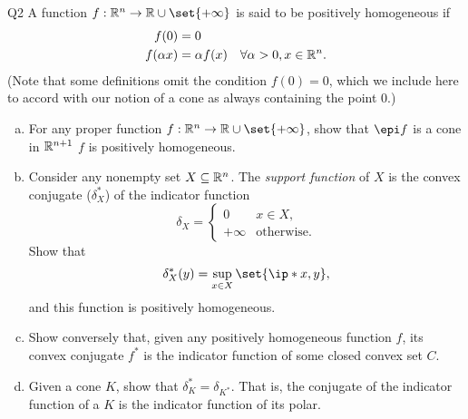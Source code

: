 \documentclass{article}
\begin{document}
\begin{problem}
    {Q2}
    A function $f:\R^n\rightarrow\R\cup\set{+\infty}$ is said to be positively homogeneous if
    \begin{align*}
        f(0) &= 0 \\
        f(\alpha x) &= \alpha f(x) \quad \forall \alpha > 0, x\in\mathbb{R}^n.
    \end{align*}
    (Note that some definitions omit the condition $f(0) = 0$, which we include here to accord with our notion of a cone as always containing the point $0$.)
    \begin{enumerate}[(a)]
        \item For any proper function $f:\R^n\rightarrow\R\cup\set{+\infty}$, show that $\epi f$ is a cone in $\mathbb{R}^{n+1}$ \iff $f$ is positively homogeneous.
        \item Consider any nonempty set $X\subseteq\mathbb{R}^n$. The \textit{support function} of $X$ is the convex conjugate ($\delta_X^*$) of the indicator function \[\delta_X = \begin{cases}
            0 & x\in X,\\
            +\infty & \text{otherwise}.
        \end{cases}\]
        Show that \[\delta_X^*(y)=\sup_{x\in X}\set{\ip*{x, y}},\] and this function is positively homogeneous.
        \item Show conversely that, given any positively homogeneous function $f$, its convex conjugate $f^*$ is the indicator function of some closed convex set $C$.
        \item Given a cone $K$, show that $\delta_K^* = \delta_{K^*}$. That is, the conjugate of the indicator function of a $K$ is the indicator function of its polar.
    \end{enumerate}
\end{problem}
\end{document}
